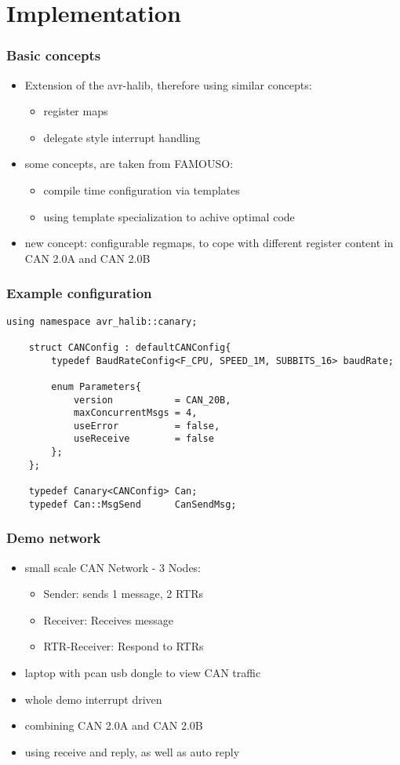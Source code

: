 \documentclass{beamer}
\begin{document}
\section{Implementation}
\begin{frame}
	\frametitle{Basic concepts}
	\begin{itemize}
		\item Extension of the avr-halib\cite{halib}, therefore using similar concepts:
		\begin{itemize}
			\item register maps
			\item delegate style interrupt handling
		\end{itemize}
		\item some concepts, are taken from FAMOUSO\cite{famouso}:
			\begin{itemize}
			\item compile time configuration via templates
			\item using template specialization to achive optimal code
			\end{itemize}
		\item new concept: configurable regmaps, to cope with different register content in CAN 2.0A and CAN 2.0B
	\end{itemize}
\end{frame}

\begin{frame}[fragile]
	\frametitle{Example configuration}
	\begin{lstlisting}[caption=An example configuration of the Canary driver class]
	using namespace avr_halib::canary;

	struct CANConfig : defaultCANConfig{
	    typedef BaudRateConfig<F_CPU, SPEED_1M, SUBBITS_16> baudRate;

	    enum Parameters{
	        version           = CAN_20B,
	        maxConcurrentMsgs = 4,
	        useError          = false,
	        useReceive        = false
	    };
	};

	typedef Canary<CANConfig> Can;
	typedef Can::MsgSend      CanSendMsg;
	\end{lstlisting}
\end{frame}

\begin{frame}
	\frametitle{Demo network}
	\begin{itemize}
		\item small scale CAN Network - 3 Nodes:
		\begin{itemize}
			\item Sender: sends 1 message, 2 RTRs
			\item Receiver: Receives message
			\item RTR-Receiver: Respond to RTRs
			\end{itemize}
		\item laptop with pcan usb dongle to view CAN traffic
		\item whole demo interrupt driven
		\item combining CAN 2.0A and CAN 2.0B
		\item using receive and reply, as well as auto reply
	\end{itemize}
\end{frame}
\end{document}
